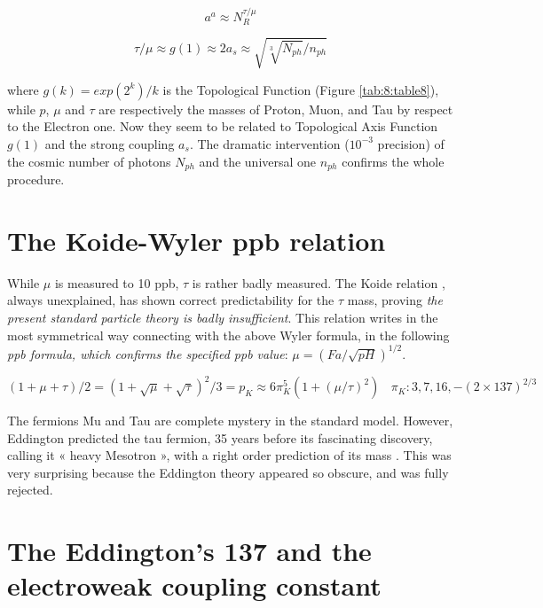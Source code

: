 \documentclass[a4paper,9pt]{article}
\begin{document}
\begin{equation}
a^a \approx N_R^{\tau/\mu} 
\end{equation}

\begin{equation}
\tau/\mu   \approx g(1) \approx  2a_s \approx \sqrt{\sqrt[3]{N_{ph}}/n_{ph}}
\end{equation}

where $g(k) = exp(2^k)/k$ is the Topological Function (Figure \ref{tab:8:table8}), while $p$, $\mu$ and $\tau$ are respectively the masses of Proton, Muon, and Tau by respect to the Electron one.  Now they seem to be related to Topological Axis Function $g(1)$ and the strong coupling $a_s$. The dramatic intervention ($10^{-3}$ precision) of the cosmic number of photons $N_{ph}$ and the universal one $n_{ph}$ confirms the whole procedure.









\section {The Koide-Wyler ppb relation}

While $\mu$ is measured to 10 ppb, $\tau$ is rather badly measured. The Koide relation \cite{Koide}, always unexplained, has shown correct predictability for the $\tau$ mass, proving \textit{the present standard particle theory is badly insufficient}. This relation writes in the most symmetrical way connecting with the above Wyler formula, in the following \textit{ppb formula, which confirms the specified ppb value}: $\mu = (Fa/\sqrt{pH})^{1/2}$\cite{Sanchez}.


\begin{equation}
(1 + \mu + \tau)/2 = (1 + \sqrt{\mu} + \sqrt{\tau})^2/3 = p_K \approx 6\pi_K^5 (1+(\mu / \tau)^2) ~~~~\pi_K: 3,7,16,-(2\times 137)^{2/3}
\end{equation}

The fermions Mu and Tau are complete mystery in the standard model. However, Eddington predicted the tau fermion, 35 years before its fascinating discovery, calling it « heavy Mesotron », with a right order prediction of its mass \cite{Eddington}.  This was very surprising because the Eddington theory appeared so obscure, and was fully rejected.

     




\section{The Eddington's 137 and the electroweak coupling constant}
\end{document}
